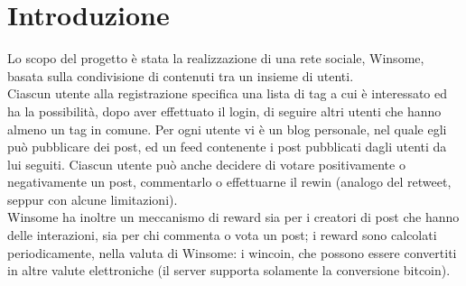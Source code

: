 \documentclass[a4paper,11pt]{article}
\begin{document}
	\section{Introduzione}
	Lo scopo del progetto è stata la realizzazione di una rete sociale, Winsome, basata sulla condivisione	di contenuti tra un insieme di utenti. \\
	Ciascun utente alla registrazione specifica una lista di tag
	a cui è interessato ed ha la possibilità, dopo aver effettuato il login, di seguire altri utenti che
	hanno almeno un tag in comune. Per ogni utente vi è un blog personale, nel quale
	egli può pubblicare dei post, ed un feed contenente i post pubblicati dagli utenti da lui seguiti. 
	Ciascun utente può anche decidere di votare positivamente o negativamente un post, commentarlo o effettuarne il rewin (analogo del retweet, seppur con alcune limitazioni). \\
	Winsome ha inoltre un meccanismo di reward sia per i creatori di post che hanno delle interazioni, sia per chi commenta o vota un post; i reward sono calcolati periodicamente, nella valuta di Winsome: i wincoin, che possono essere convertiti in altre valute elettroniche (il server supporta solamente la conversione bitcoin).\\
	
	
	
	
	
	
	
	
	
	
\end{document}
